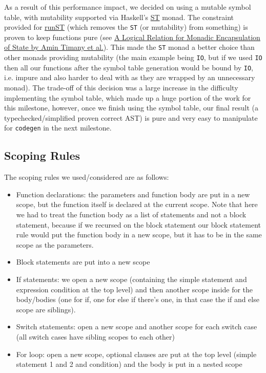 \documentclass[11pt]{article}
\begin{document}
As a result of this performance impact, we decided on using a
mutable symbol table, with mutability supported via Haskell's \href{https://hackage.haskell.org/package/base-4.12.0.0/docs/Control-Monad-ST.html}{ST}
monad. The constraint provided for \href{https://hackage.haskell.org/package/base-4.12.0.0/docs/Control-Monad-ST.html\#v:runST}{runST} (which removes the \texttt{ST} (or
mutability) from something) is proven to keep functions pure (see
\href{https://iris-project.org/pdfs/2018-popl-runST-final.pdf}{A Logical
Relation for Monadic Encapsulation of State by Amin Timany et
al.}). This made the \texttt{ST} monad a better choice than other monads
providing mutability (the main example being \texttt{IO}, but if we used
\texttt{IO} then all our functions after the symbol table generation would
be bound by \texttt{IO}, i.e. impure and also harder to deal with as they
are wrapped by an unnecessary monad). The trade-off of this decision
was a large increase in the difficulty implementing the symbol
table, which made up a huge portion of the work for this milestone,
however, once we finish using the symbol table, our final result (a
typechecked/simplified proven correct AST) is pure and very easy to
manipulate for \texttt{codegen} in the next milestone.
\subsection{Scoping Rules}
\label{sec:org6fa44bd}
The scoping rules we used/considered are as follows:
\begin{itemize}
\item Function declarations: the parameters and function body are put
in a new scope, but the function itself is declared at the
current scope. Note that here we had to treat the function body
as a list of statements and not a block statement, because if we
recursed on the block statement our block statement rule would
put the function body in a new scope, but it has to be in the
same scope as the parameters.
\item Block statements are put into a new scope
\item If statements: we open a new scope (containing the simple
statement and expression condition at the top level) and then
another scope inside for the body/bodies (one for if, one for
else if there's one, in that case the if and else scope are
siblings).
\item Switch statements: open a new scope and another scope for each
switch case (all switch cases have sibling scopes to each other)
\item For loop: open a new scope, optional clauses are put at the top
level (simple statement 1 and 2 and condition) and the body is
put in a nested scope
\end{itemize}
\end{document}
